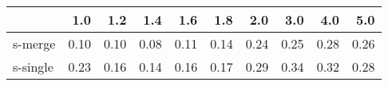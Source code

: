 \begin{tabular}{lrrrrrrrrr}
\toprule
{} &  1.0 &  1.2 &  1.4 &  1.6 &  1.8 &  2.0 &  3.0 &  4.0 &  5.0 \\
\midrule
s-merge  & 0.10 & 0.10 & 0.08 & 0.11 & 0.14 & 0.24 & 0.25 & 0.28 & 0.26 \\
s-single & 0.23 & 0.16 & 0.14 & 0.16 & 0.17 & 0.29 & 0.34 & 0.32 & 0.28 \\
\bottomrule
\end{tabular}
